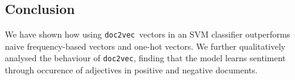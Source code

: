 \documentclass[12pt]{article}
\newcommand{\docvec}{\texttt{doc2vec}}
\begin{document}
\begin{multicols}{2}
\section*{Conclusion}

We have shown how using \docvec~vectors in an SVM classifier outperforms naive frequency-based vectors and one-hot vectors. We further qualitatively analysed the behaviour of \docvec, finding that the model learns sentiment through occurence of adjectives in positive and negative documents.




\end{multicols}
\end{document}
